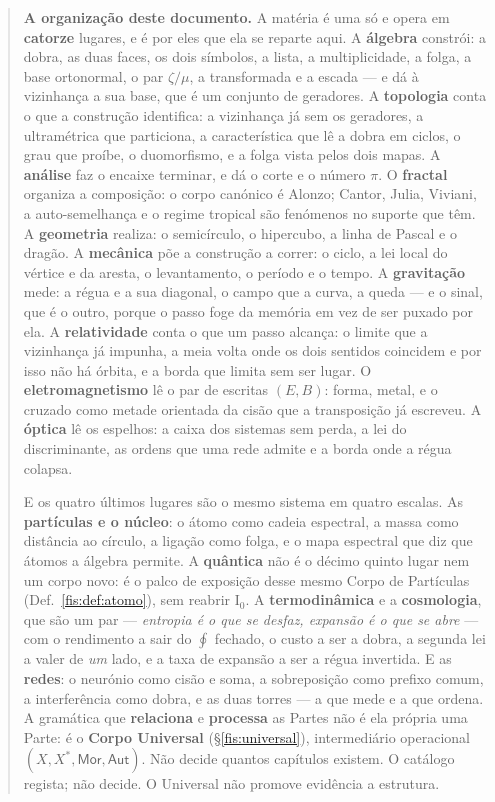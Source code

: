 \documentclass[livro.tex]{subfiles}
\begin{document}
\begin{abstract}
\medskip\noindent\textbf{A organização deste documento.} A matéria é uma só e
opera em \textbf{catorze} lugares, e é por eles que ela se reparte aqui. A
\textbf{álgebra} constrói: a dobra, as duas faces, os dois símbolos, a lista, a
multiplicidade, a folga, a base ortonormal, o par $\zeta/\mu$, a transformada e a
escada --- e dá à vizinhança a sua base, que é um conjunto de geradores. A
\textbf{topologia} conta o que a construção identifica: a vizinhança já sem os
geradores, a ultramétrica que particiona, a característica que lê a dobra em
ciclos, o grau que proíbe, o duomorfismo, e a folga vista pelos dois mapas. A
\textbf{análise} faz o encaixe terminar, e dá o corte e o número $\pi$. O
\textbf{fractal} organiza a composição: o corpo canónico é Alonzo; Cantor, Julia,
Viviani, a auto-semelhança e o regime tropical são fenómenos no suporte que
têm. A
\textbf{geometria} realiza: o semicírculo, o hipercubo, a linha de Pascal e o
dragão. A \textbf{mecânica} põe a construção a
correr: o ciclo, a lei local do vértice e da aresta, o levantamento, o período e
o tempo. A \textbf{gravitação} mede: a régua e a sua diagonal, o campo que a
curva, a queda --- e o sinal, que é o outro, porque o passo foge da memória em
vez de ser puxado por ela. A \textbf{relatividade} conta o que um passo alcança: o limite que a
vizinhança já impunha, a meia volta onde os dois sentidos coincidem e por isso
não há órbita, e a borda que limita sem ser lugar. O \textbf{eletromagnetismo}
lê o par de escritas $(E,B)$: forma, metal, e o cruzado como metade orientada
da cisão que a transposição já escreveu. A \textbf{óptica} lê os
espelhos: a caixa dos sistemas sem perda, a lei
do discriminante, as ordens que uma rede admite e a borda onde a régua colapsa.

\medskip\noindent E os quatro últimos lugares são o mesmo sistema em quatro
escalas. As \textbf{partículas e o núcleo}: o átomo como cadeia espectral, a
massa como distância ao círculo, a ligação como folga, e o mapa espectral que diz
que átomos a álgebra permite. A \textbf{quântica} não é o décimo quinto lugar
nem um corpo novo: é o palco de exposição desse mesmo Corpo de Partículas
(Def.~\ref{fis:def:atomo}), sem reabrir $\mathrm{I}_{0}$. A \textbf{termodinâmica} e a \textbf{cosmologia},
que são um par --- \emph{entropia é o que se desfaz, expansão é o que se abre} ---
com o rendimento a sair do $\oint$ fechado, o custo a ser a dobra, a segunda lei a
valer de \emph{um} lado, e a taxa de expansão a ser a régua invertida. E as
\textbf{redes}: o neurónio como cisão e soma, a sobreposição como prefixo comum,
a interferência como dobra, e as duas torres --- a que mede e a que ordena.
A gramática que \textbf{relaciona} e \textbf{processa} as Partes não é
ela própria uma Parte: é o \textbf{Corpo Universal} (§\ref{fis:universal}),
intermediário operacional $(X,X^{*},\mathsf{Mor},\mathsf{Aut})$. Não decide
quantos capítulos existem. O catálogo
regista; não decide. O Universal não promove evidência a estrutura.


\end{abstract}
\end{document}
